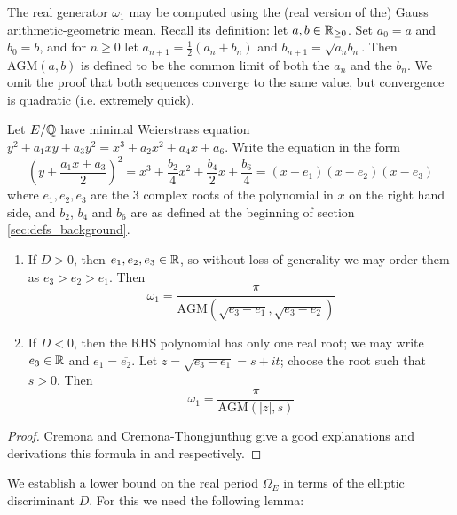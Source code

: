 \documentclass[10pt]{article}
\newcommand{\AGM}{\text{AGM}}
\newcommand{\conj}[1]{\overline{#1}}
\begin{document}
The real generator $\omega_1$ may be computed using the (real version of the) Gauss arithmetic-geometric mean. Recall its definition: let $a,b \in \mathbb{R}_{\ge0}$. Set $a_0 = a$ and $b_0 = b$, and for $n\ge 0$ let $a_{n+1} = \frac{1}{2}(a_{n}+b_{n})$ and $b_{n+1} = \sqrt{a_{n}b_{n}}$. Then $\AGM(a,b)$ is defined to be the common limit of both the $a_n$ and the $b_n$. We omit the proof that both sequences converge to the same value, but convergence is quadratic (i.e. extremely quick).

\begin{proposition}
Let $E/\mathbb{Q}$ have minimal Weierstrass equation $y^2 + a_1 xy + a_3 y^2 = x^3 + a_2 x^2 + a_4 x + a_6$. Write the equation in the form
\begin{equation}\label{eqn:weierstrass_with_bn}
\left(y + \frac{a_1x + a_3}{2}\right)^2 = x^3 + \frac{b_2}{4} x^2 + \frac{b_4}{2} x + \frac{b_6}{4} = (x-e_1)(x-e_2)(x-e_3)
\end{equation}
where $e_1,e_2,e_3$ are the 3 complex roots of the polynomial in $x$ on the right hand side, and $b_2$, $b_4$ and $b_6$ are as defined at the beginning of section \ref{sec:defs_background}.
\begin{enumerate}
\item If $D > 0$, then $e_1,e_2,e_3 \in \mathbb{R}$, so without loss of generality we may order them as $e_3 > e_2 > e_1$. Then
\begin{equation}\label{eqn:omega_D_pos}
\omega_1 = \frac{\pi}{\AGM(\sqrt{e_3-e_1},\sqrt{e_3-e_2})}
\end{equation}
\item If $D < 0$, then the RHS polynomial has only one real root; we may write $e_3 \in \mathbb{R}$ and $e_1 = \conj{e_2}$. Let $z = \sqrt{e_3-e_1} = s + it$; choose the root such that $s>0$. Then
\begin{equation}\label{eqn:omega_D_neg}
\omega_1 = \frac{\pi}{\AGM(|z|,s)}
\end{equation}
\end{enumerate}
\end{proposition}
\begin{proof}
Cremona and Cremona-Thongjunthug give a good explanations and derivations this formula in \cite{Cre-1997} and \cite{Cre-2013} respectively.
\end{proof}

We establish a lower bound on the real period $\Omega_E$ in terms of the elliptic discriminant $D$. For this we need the following lemma:
\end{document}
